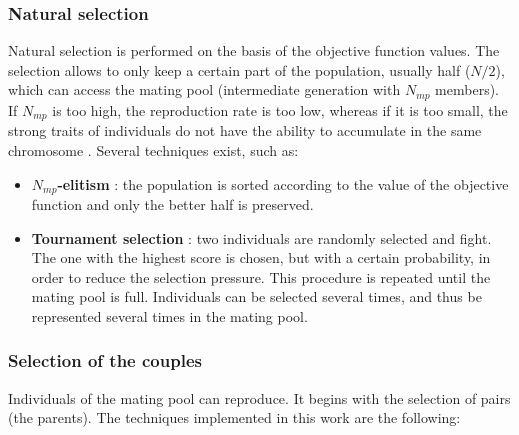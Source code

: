 \documentclass[twocol]{ametsoc}
\begin{document}
\subsubsection{Natural selection}

Natural selection is performed on the basis of the objective function values. The selection allows to only keep a certain part of the population, usually half ($N/2$), which can access the mating pool (intermediate generation with $N_{mp}$ members). If $N_{mp}$ is too high, the reproduction rate is too low, whereas if it is too small, the strong traits of individuals do not have the ability to accumulate in the same chromosome \citep{Haupt2004}. Several techniques exist, such as:

\begin{itemize}
	\item \textbf{$N_{mp}$-elitism} \citep{Michalewicz1996}: the population is sorted according to the value of the objective function and only the better half is preserved. 
		
	\item \textbf{Tournament selection} \citep{Michalewicz1996, Zitzler2004a}: two individuals are randomly selected and fight. The one with the highest score is chosen, but with a certain probability, in order to reduce the selection pressure. This procedure is repeated until the mating pool is full. Individuals can be selected several times, and thus be represented several times in the mating pool.
\end{itemize}


\subsubsection{Selection of the couples}

Individuals of the mating pool can reproduce. It begins with the selection of pairs (the parents). The techniques implemented in this work are the following:
\end{document}
